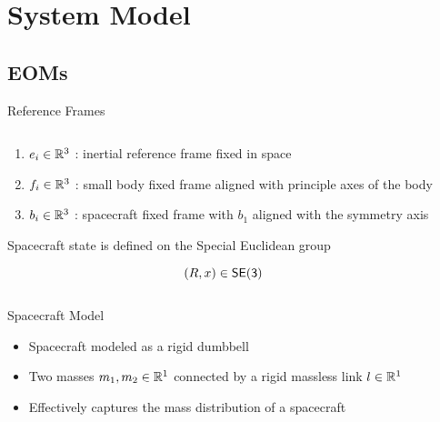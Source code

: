 
\section{System Model}
\subsection{EOMs}

\begin{frame}{Reference Frames}

    \begin{columns}
        \begin{column}{0.5\textwidth}
            \begin{enumerate}
                \item \( e_i \in \mathbb{R}^3 \) : inertial reference frame fixed in space
                \item \( f_i \in \mathbb{R}^3 \) : small body fixed frame aligned with principle axes of the body
                \item \( b_i \in \mathbb{R}^3 \) : spacecraft fixed frame with \( b_1 \) aligned with the symmetry axis
            \end{enumerate}
            
            \begin{block}{}
                Spacecraft state is defined on the Special Euclidean group

                \[ \left( R, x \right) \in \mathsf{SE(3)} \]
            \end{block}
        \end{column}
        \begin{column}{0.5\textwidth}
            \begin{scaletikzpicturetowidth}{2\columnwidth}
                \resizebox{\columnwidth}{!}{%
                
            }
            \end{scaletikzpicturetowidth}
        \end{column}
    \end{columns}
\end{frame}

\begin{frame}{Spacecraft Model}
    \begin{itemize}
        \item Spacecraft modeled as a rigid dumbbell
        \item Two masses \( m_1, m_2 \in \mathbb{R}^1 \) connected by a rigid massless link \( l \in \mathbb{R}^1\)
        \item Effectively captures the mass distribution of a spacecraft
    \end{itemize}

    \resizebox{\textwidth}{!}{%
        
    }
\end{frame}

